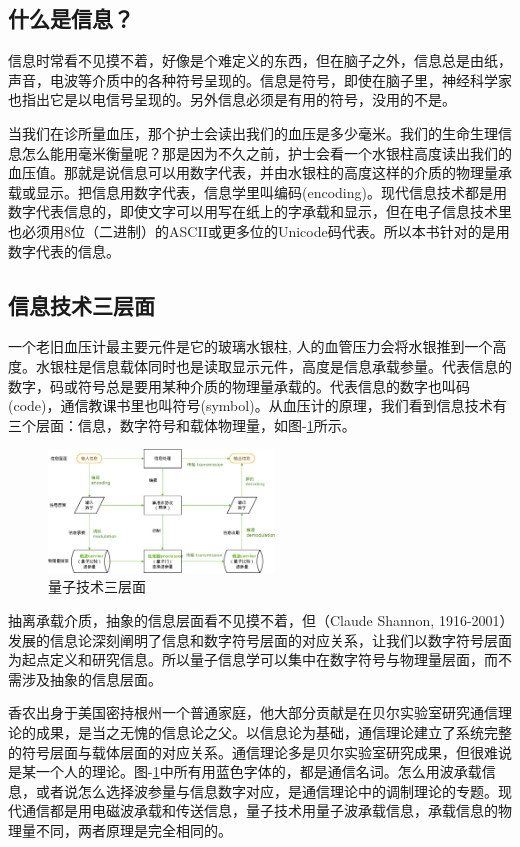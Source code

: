 \documentclass{ctexbook}
\begin{document}
\subsection{什么是信息？}
信息时常看不见摸不着，好像是个难定义的东西，但在脑子之外，信息总是由纸，声音，电波等介质中的各种符号呈现的。信息是符号，即使在脑子里，神经科学家也指出它是以电信号呈现的。另外信息必须是有用的符号，没用的不是。

当我们在诊所量血压，那个护士会读出我们的血压是多少毫米。我们的生命生理信息怎么能用毫米衡量呢？那是因为不久之前，护士会看一个水银柱高度读出我们的血压值。那就是说信息可以用数字代表，并由水银柱的高度这样的介质的物理量承载或显示。把信息用数字代表，信息学里叫编码(encoding)。现代信息技术都是用数字代表信息的，即使文字可以用写在纸上的字承载和显示，但在电子信息技术里也必须用8位（二进制）的ASCII或更多位的Unicode码代表。所以本书针对的是用数字代表的信息。

\subsection{信息技术三层面}
一个老旧血压计最主要元件是它的玻璃水银柱, 人的血管压力会将水银推到一个高度。水银柱是信息载体同时也是读取显示元件，高度是信息承载参量。代表信息的数字，码或符号总是要用某种介质的物理量承载的。代表信息的数字也叫码(code)，通信教课书里也叫符号(symbol)。从血压计的原理，我们看到信息技术有三个层面：信息，数字符号和载体物理量，如图-\ref{fig:3levels}所示。

\begin{figure}\label{fig:3levels}
    \centering
    \includegraphics[width=6cm]{pic/qinfo_flow.eps}
    \caption{量子技术三层面}
\end{figure}

抽离承载介质，抽象的信息层面看不见摸不着，但（Claude Shannon, 1916-2001）发展的信息论深刻阐明了信息和数字符号层面的对应关系，让我们以数字符号层面为起点定义和研究信息。所以量子信息学可以集中在数字符号与物理量层面，而不需涉及抽象的信息层面。

香农出身于美国密持根州一个普通家庭，他大部分贡献是在贝尔实验室研究通信理论的成果，是当之无愧的信息论之父。以信息论为基础，通信理论建立了系统完整的符号层面与载体层面的对应关系。通信理论多是贝尔实验室研究成果，但很难说是某一个人的理论。图-\ref{fig:3levels}中所有用蓝色字体的，都是通信名词。怎么用波承载信息，或者说怎么选择波参量与信息数字对应，是通信理论中的调制理论的专题。现代通信都是用电磁波承载和传送信息，量子技术用量子波承载信息，承载信息的物理量不同，两者原理是完全相同的。
\end{document}
